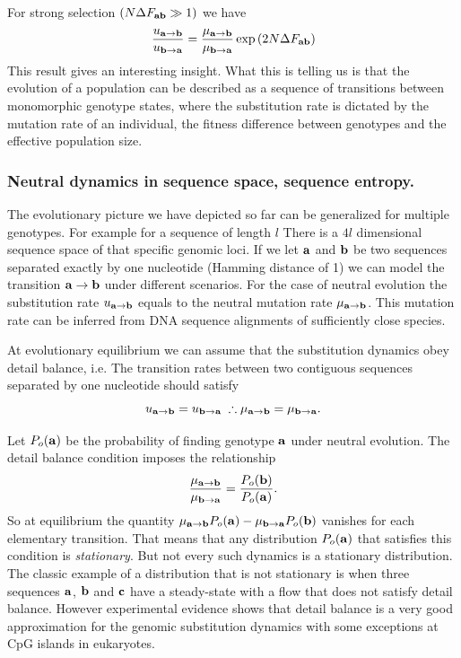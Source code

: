 For strong selection $(N \Delta F_{\mathbf{ab}} \gg 1)$ we have
\begin{equation}
  {u_{\mathbf{a} \rightarrow \mathbf{b}}\over u_{\mathbf{b} \rightarrow \mathbf{a}}} = {\mu_{\mathbf{a} \rightarrow \mathbf{b}} \over \mu_{\mathbf{b} \rightarrow \mathbf{a}}}
  \exp \left( 2 N \Delta F_{\mathbf{ab}} \right)
\end{equation}
This result gives an interesting insight. What this is telling us is that the
evolution of a population can be described as a sequence of transitions between
monomorphic genotype states, where the substitution rate is dictated by the
mutation rate of an individual, the fitness difference between genotypes and the
effective population size.

\subsubsection{Neutral dynamics in sequence space, sequence entropy.}

The evolutionary picture we have depicted so far can be generalized for multiple
genotypes. For example for a sequence of length $l$ There is a $4l$	dimensional
sequence space of that specific genomic loci. If we let $\mathbf{a}$ and $\mathbf{b}$ be
two sequences separated exactly by one nucleotide (Hamming distance of 1) we can
model the transition $\mathbf{a} \rightarrow \mathbf{b}$ under different scenarios. For
the case of neutral evolution the substitution rate $u_{\mathbf{a} \rightarrow \mathbf{b}}$ equals to the
neutral mutation rate $\mu_{\mathbf{a} \rightarrow \mathbf{b}}$. This mutation rate can be inferred from DNA
sequence alignments of sufficiently close species.

At evolutionary equilibrium we can assume that the substitution dynamics obey
detail balance, i.e. The transition rates between two contiguous sequences
separated by one nucleotide should satisfy
\begin{equation}
  u_{\mathbf{a} \rightarrow \mathbf{b}} = u_{\mathbf{b} \rightarrow \mathbf{a}} \; \therefore \mu_{\mathbf{a} \rightarrow \mathbf{b}} = \mu_{\mathbf{b} \rightarrow \mathbf{a}}.
\end{equation}

Let $P_o(\mathbf{a})$ be the probability of finding genotype $\mathbf{a}$ under neutral
evolution. The detail balance condition imposes the relationship
\begin{equation}
  {\mu_{\mathbf{a} \rightarrow \mathbf{b}}\over \mu_{\mathbf{b} \rightarrow \mathbf{a}}} = {P_o(\mathbf{b}) \over P_o(\mathbf{a})}.
\end{equation}
So at equilibrium the quantity $\mu_{\mathbf{a} \rightarrow \mathbf{b}} P_o(\mathbf{a}) - \mu_{\mathbf{b} \rightarrow \mathbf{a}} P_o(\mathbf{b})$
vanishes for each elementary transition. That means that any distribution
$P_o(\mathbf{a})$ that satisfies this condition is {\it stationary}. But not every
such dynamics is a stationary distribution. The classic example of a
distribution that is not stationary is when three sequences $\mathbf{a}$, $\mathbf{b}$
and $\mathbf{c}$ have a steady-state with a flow that does not satisfy detail
balance. However experimental evidence shows that detail balance is a very good
approximation for the genomic substitution dynamics with some exceptions at CpG
islands in eukaryotes.


